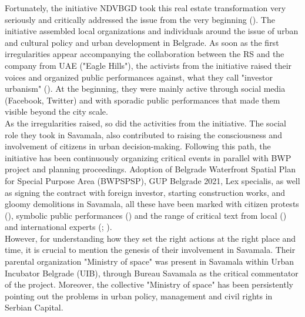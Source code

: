 \documentclass[11pt]{report}
\begin{document}
Fortunately, the initiative NDVBGD took this real estate transformation very seriously and critically addressed the issue from the very beginning (\cite{NeDa(vi)moBeograd}). %
The initiative assembled local organizations and individuals around the issue of urban and cultural policy and urban development in Belgrade.
As soon as the first irregularities appear accompanying the collaboration between the RS and the company from UAE ("Eagle Hills"), the activists from the initiative raised their voices and organized public performances against, what they call "investor urbanism" (\cite{SlobodnaEvropa2014}).%
 At the beginning, they were mainly active through social media (Facebook, Twitter) and with sporadic public performances that made them visible beyond the city scale.
\\

As the irregularities raised, so did the activities from the initiative.
The social role they took in Savamala, also contributed to raising the consciousness and involvement of citizens in urban decision-making.
Following this path, the initiative has been continuously organizing critical events in parallel with BWP project and planning proceedings.
Adoption of Belgrade Waterfront Spatial Plan for Special Purpose Area (BWPSPSP), GUP Belgrade 2021, Lex specialis, as well as signing the contract with foreign investor, starting construction works, and gloomy demolitions in Savamala, all these have been marked with citizen protests (\cite{media?}), symbolic public performances (\cite{media?}) and the range of critical text from local (\cite{media?}) and international experts (\cite{TheSpectacleBlog2014}; \href{ref}{\citealt{krusche_bureau_2015}}).
\\

However, for understanding how they set the right actions at the right place and time, it is crucial to mention the genesis of their involvement in Savamala.
Their parental organization "Ministry of space" was present in Savamala within Urban Incubator Belgrade (UIB), through Bureau Savamala as the critical commentator of the project.
Moreover, the collective "Ministry of space" has been persistently pointing out the problems in urban policy, management and civil rights in Serbian Capital.
\\
\end{document}
